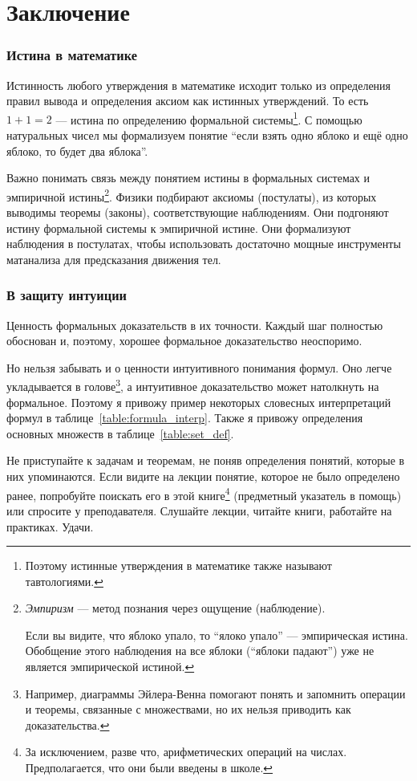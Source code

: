 \part{Заключение}

\section{Истина в математике}

Истинность любого утверждения в математике исходит только из определения правил
вывода и определения аксиом как истинных утверждений.
То есть $1+1=2$ --- истина по определению формальной системы\footnote{
	Поэтому истинные утверждения в математике также называют тавтологиями.}.
С помощью натуральных чисел мы формализуем понятие ``если взять одно яблоко
и ещё одно яблоко, то будет два яблока''.

Важно понимать связь между понятием истины в формальных системах
и эмпиричной истины\footnote{{\it Эмпиризм}
	--- метод познания через ощущение (наблюдение).

	Если вы видите, что яблоко упало, то ``ялоко упало'' --- эмпирическая истина.
	Обобщение этого наблюдения на все яблоки (``яблоки падают'') уже не является
	эмпирической истиной.}.
Физики подбирают аксиомы (постулаты),
из которых выводимы теоремы (законы), соответствующие наблюдениям.
Они подгоняют истину формальной системы к эмпиричной истине.
Они формализуют наблюдения в постулатах, чтобы использовать достаточно мощные
инструменты матанализа для предсказания движения тел.

\section{В защиту интуиции}

Ценность формальных доказательств в их точности.
Каждый шаг полностью обоснован и,
поэтому, хорошее формальное доказательство неоспоримо.

Но нельзя забывать и о ценности интуитивного понимания формул.
Оно легче укладывается в голове\footnote{Например, диаграммы
	Эйлера-Венна помогают понять и запомнить операции и теоремы, связанные с
	множествами, но их нельзя приводить как доказательства.},
а интуитивное доказательство может натолкнуть на формальное.
Поэтому я привожу пример некоторых словесных интерпретаций
формул в таблице~\ref{table:formula_interp}.
Также я привожу определения основных множеств в таблице~\ref{table:set_def}.

Не приступайте к задачам и теоремам, не поняв определения понятий,
которые в них упоминаются. Если видите на лекции понятие,
которое не было определено ранее,
попробуйте поискать его в этой книге\footnote{
	За исключением, разве что, арифметических операций на числах.
	Предполагается, что они были введены в школе.
} (предметный указатель в помощь) или спросите у преподавателя.
Слушайте лекции, читайте книги, работайте
на практиках. Удачи.

